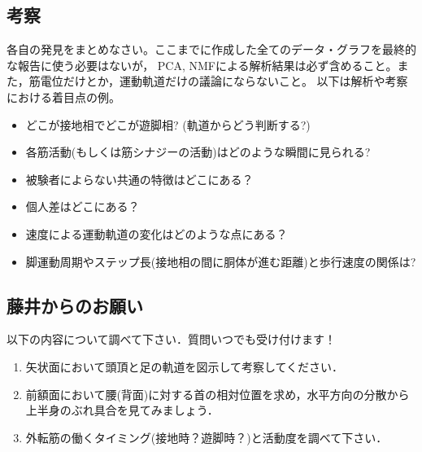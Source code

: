 \documentclass{jarticle}
\begin{document}
\subsection{考察}
各自の発見をまとめなさい。ここまでに作成した全てのデータ・グラフを最終的な報告に使う必要はないが，
PCA, NMFによる解析結果は必ず含めること。また，筋電位だけとか，運動軌道だけの議論にならないこと。
以下は解析や考察における着目点の例。

\begin{itemize}
\item どこが接地相でどこが遊脚相? (軌道からどう判断する?)
\item 各筋活動(もしくは筋シナジーの活動)はどのような瞬間に見られる?
\item 被験者によらない共通の特徴はどこにある？
\item 個人差はどこにある？
\item 速度による運動軌道の変化はどのような点にある？
\item 脚運動周期やステップ長(接地相の間に胴体が進む距離)と歩行速度の関係は?
\end{itemize}



\subsection{藤井からのお願い}
以下の内容について調べて下さい．質問いつでも受け付けます！
\begin{enumerate}
\item 矢状面において頭頂と足の軌道を図示して考察してください．
\item 前額面において腰(背面)に対する首の相対位置を求め，水平方向の分散から上半身のぶれ具合を見てみましょう．
\item 外転筋の働くタイミング(接地時？遊脚時？)と活動度を調べて下さい．
\end{enumerate}
\end{document}
